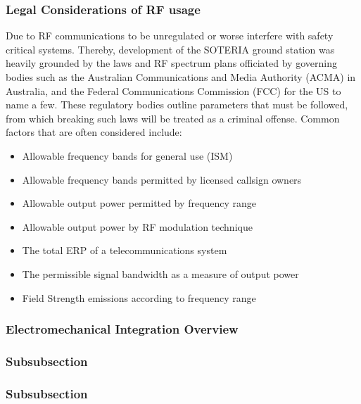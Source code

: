 \subsubsection{Legal Considerations of RF usage}
Due to RF communications to be unregulated or worse interfere with safety critical systems. Thereby, development of the SOTERIA ground station was heavily grounded by the laws and RF spectrum plans officiated by governing bodies such as the Australian Communications and Media Authority (ACMA)\cite{AMCA} in Australia, and the Federal Communications Commission (FCC)\cite{FCC} for the US to name a few. These regulatory bodies outline parameters that must be followed, from which breaking such laws will be treated as a criminal offense. Common factors that are often considered include:
\begin{itemize}
    \item Allowable frequency bands for general use (ISM)
    \item Allowable frequency bands permitted by licensed callsign owners
    \item Allowable output power permitted by frequency range
    \item Allowable output power by RF modulation technique
    \item The total ERP of a telecommunications system
    \item The permissible signal bandwidth as a measure of output power
    \item Field Strength emissions according to frequency range
\end{itemize}

\subsubsection{Electromechanical Integration Overview}
\subsubsection{Subsubsection}
\subsubsection{Subsubsection}
\clearpage
